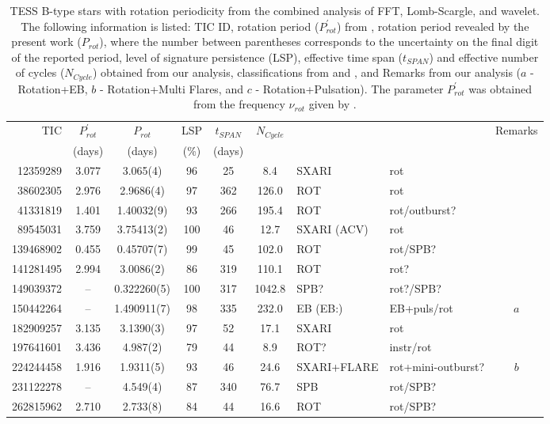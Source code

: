 \documentclass[RNAAS]{aastex63}
\begin{document}
\begin{table}[h]
    \centering
   \caption{\label{TABLE 2} TESS B-type stars with rotation periodicity from the combined analysis of FFT, Lomb-Scargle, and wavelet. The following information is listed: TIC ID, rotation period ($P_{rot}^{'}$) from \citet{Balona2019}, rotation period revealed by the present work ($P_{rot}$), where the number between parentheses corresponds to the uncertainty on the final digit of the reported period, level of signature persistence (LSP), effective time span ($t_{SPAN}$) and effective number of cycles ($N_{Cycle}$) obtained from our analysis, classifications from \citet{Balona2019} and \citet{Pedersen2019}, and Remarks from our analysis ($a$ - Rotation+EB, $b$ - Rotation+Multi Flares, and $c$ - Rotation+Pulsation). The parameter $P_{rot}^{'}$ was obtained from the frequency $\nu_{rot}$ given by \citet{Balona2019}.}
    \begin{tabular}{rcccccllc}
        \hline \hline
TIC	&	$P_{rot}^{'}$	&	$P_{rot}$	& 	LSP	&	$t_{SPAN}$	&	$N_{Cycle}$	& \cite{Balona2019} &	\citet{Pedersen2019}	&	Remarks\\
	&	(days)	&	(days)	&	(\%)	&	(days)	&		&&		&	\\
\hline
12359289	&	3.077	&	3.065(4)&		96	&	25	&	8.4	&SXARI&	rot	&	\\
38602305	&	2.976 &	2.9686(4)&		97	&	362	&	126.0	&ROT&	rot 	&	 \\
41331819	&	1.401	&	1.40032(9)&		93	&	266	&	195.4	&ROT&	rot/outburst?	&	\\
89545031	&	3.759	&	3.75413(2)&		100	&	46	&	12.7	&SXARI (ACV)&	rot	&	\\
139468902	&	0.455	&	0.45707(7)&		99	&	45	&	102.0	&ROT&	rot/SPB?	&	\\
141281495	&	2.994	&	3.0086(2)&		86	&	319	&	110.1	&ROT&	rot?	&	\\
149039372	&	--	&	0.322260(5)&		100	&	317	&	1042.8	&SPB?&	rot?/SPB?	&	\\
150442264	&	--	&	1.490911(7)&		98	&	335	&	232.0	&EB (EB:)&	EB+puls/rot	&	$a$\\
182909257	&	3.135	&	3.1390(3)&		97	&	52	&	17.1	&SXARI&	rot	&	\\
197641601	&	3.436	&	4.987(2)&		79	&	44	&	8.9	&ROT?&	instr/rot 	&	  \\
224244458	&	1.916	&	1.9311(5)&		93	&	46	&	24.6	&SXARI+FLARE&	rot+mini-outburst?	&	$b$\\
231122278	&	--	&	4.549(4)&		87	&	340	&	76.7	&SPB&	rot/SPB?	&	\\
262815962	&	2.710	&	2.733(8)&		84	&	44	&	16.6	&ROT&	rot/SPB?	&	\\

\end{tabular}
\end{table}
\end{document}
